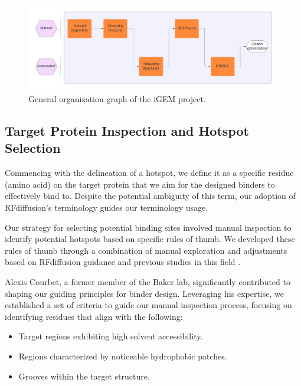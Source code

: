 \documentclass[11pt,a4paper]{article}
\begin{document}
\begin{figure}[ht]
    \centering
    \includegraphics[width=\textwidth]{Supplementary Data/Figures/iGEM_project_general_organization_graph.pdf}
    \caption{General organization graph of the iGEM project.}
    \label{fig:organization_graph}
\end{figure}

\subsection{Target Protein Inspection and Hotspot Selection}

Commencing with the delineation of a hotspot, we define it as a specific residue (amino acid) on the target protein that we aim for the designed binders to effectively bind to. Despite the potential ambiguity of this term, our adoption of RFdiffusion's terminology guides our terminology usage.

Our strategy for selecting potential binding sites involved manual inspection to identify potential hotspots based on specific rules of thumb. We developed these rules of thumb through a combination of manual exploration and adjustments based on RFdiffusion guidance \cite{rfdiffusion_github} and previous studies in this field \cite{chen2013protein}.

Alexis Courbet, a former member of the Baker lab, significantly contributed to shaping our guiding principles for binder design. Leveraging his expertise, we established a set of criteria to guide our manual inspection process, focusing on identifying residues that align with the following:

\begin{itemize}
\item Target regions exhibiting high solvent accessibility.
\item Regions characterized by noticeable hydrophobic patches.
\item Grooves within the target structure.
\end{itemize}
\end{document}

